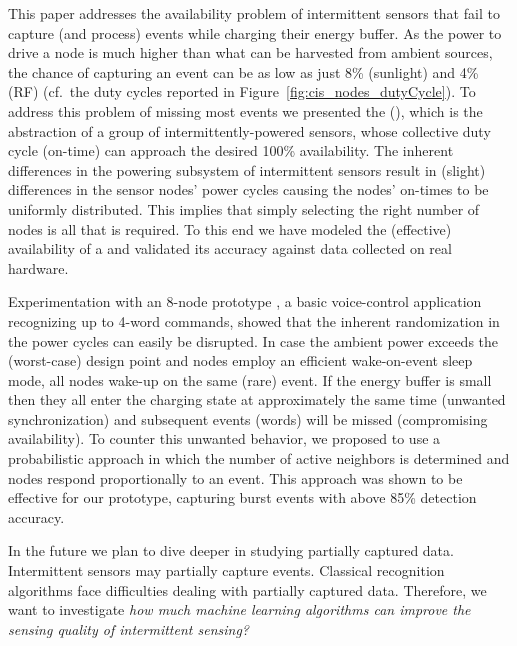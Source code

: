 This paper addresses the availability problem of intermittent sensors
that fail to capture (and process) events while charging their energy
buffer.  As the power to drive a node is much higher than what can be
harvested from ambient sources, the chance of capturing an event can
be as low as just 8\% (sunlight) and 4\% (RF) (cf.\ the duty cycles
reported in Figure~\ref{fig:cis_nodes_dutyCycle}). To address this problem of missing
most events we presented the \fullcis (\cis),
which is the abstraction of a group of intermittently-powered sensors,
whose collective duty cycle (on-time) can approach the desired 100\%
availability.  The inherent differences in the powering subsystem of
intermittent sensors result in (slight) differences in the sensor nodes'
power cycles causing the nodes' on-times to be uniformly distributed. This
implies that simply selecting the right number of nodes is all that
is required. To this end we have modeled the (effective) availability
of a \cis and validated its accuracy against data collected on real
hardware.

Experimentation with an 8-node prototype \cis, a basic voice-control
application recognizing up to 4-word commands, showed that the inherent
randomization in the power cycles can easily be disrupted. In case the
ambient power exceeds the (worst-case) design point and nodes employ an
efficient wake-on-event sleep mode, all nodes wake-up on the same (rare)
event. If the energy buffer is small then they all enter the charging
state at approximately the same time (unwanted synchronization) and
subsequent events (words) will be missed (compromising availability).
To counter this unwanted behavior, we proposed to use a probabilistic
approach in which the number of active neighbors is determined and nodes
respond proportionally to an event. This approach was shown to be effective
for our prototype, capturing burst events with above 85\% detection accuracy.

In the future we plan to dive deeper in studying partially captured data. 
Intermittent sensors may partially capture events. Classical recognition 
algorithms face difficulties dealing with partially captured data. 
Therefore, we want to investigate \emph{how much machine learning algorithms 
can improve the sensing quality of intermittent sensing?} 


